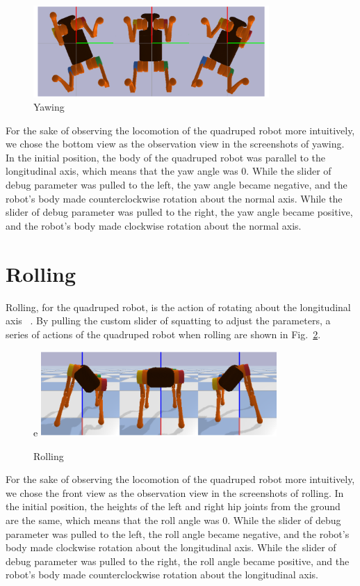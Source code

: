 \begin{figure}[htbp]
    \centering
    \includegraphics[width=0.8\textwidth]{figures/yawing.png}
    \caption{Yawing}
    \label{fig: yawing}
\end{figure}


For the sake of observing the locomotion of the quadruped robot more intuitively, we chose the bottom view as the observation view in the screenshots of yawing. In the initial position, the body of the quadruped robot was parallel to the longitudinal axis, which means that the yaw angle was 0. While the slider of debug parameter was pulled to the left, the yaw angle became negative, and the robot's body made counterclockwise rotation about the normal axis. While the slider of debug parameter was pulled to the right, the yaw angle became positive, and the robot's body made clockwise rotation about the normal axis.


\section{Rolling}

Rolling, for the quadruped robot, is the action of rotating about the longitudinal axis ~\cite{ref:6DOF}. By pulling the custom slider of squatting to adjust the parameters, a series of actions of the quadruped robot when rolling are shown in Fig.~\ref{fig: rolling}.

\begin{figure}[htbp]e
    \centering
    \includegraphics[width=0.8\textwidth]{figures/rolling.png}
    \caption{Rolling}
    \label{fig: rolling}
\end{figure}

For the sake of observing the locomotion of the quadruped robot more intuitively, we chose the front view as the observation view in the screenshots of rolling. In the initial position, the heights of the left and right hip joints from the ground are the same, which means that the roll angle was 0. While the slider of debug parameter was pulled to the left, the roll angle became negative, and the robot's body made clockwise rotation about the longitudinal axis. While the slider of debug parameter was pulled to the right, the roll angle became positive, and the robot's body made counterclockwise rotation about the longitudinal axis.




